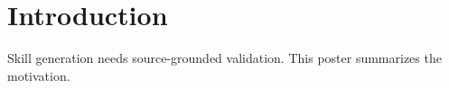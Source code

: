 \section{Introduction}
Skill generation needs source-grounded validation. This poster summarizes the motivation.
